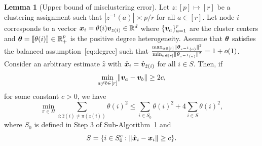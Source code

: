 \documentclass[lettersize,onecolumn,journal]{IEEEtran}
\theoremstyle{definition}
\newtheorem{lem}{Lemma}
\theoremstyle{definition}
\begin{document}
\begin{lem}[Upper bound of misclustering error]\label{lem:upper_mis} Let $z: [p] \mapsto [r]$ be a clustering assignment such that $|z^{-1}(a)| \asymp p/r$ for all $a \in [r]$. Let node $i$ corresponds to a vector $\bm x_i  = \theta(i) \bm{v}_{z(i)} \in \mathbb{R}^d$ where $\{\bm{v}_a\}_{a = 1}^r$ are the cluster centers and $\boldsymbol{\theta} = \llbracket \theta(i) \rrbracket \in \mathbb{R}^p_+$ is the positive degree heterogeneity. Assume that  $\boldsymbol{\theta}$ satisfies the balanced assumption~\eqref{eq:degree} such that ${\max_{a \in [r]} \lVert\boldsymbol{\theta}_{z^{-1}(a)}\rVert^2 \over \min_{a \in [r]} \lVert\boldsymbol{\theta}_{z^{-1}(a)}\rVert^2 }= 1 + o(1)$. Consider an arbitrary estimate $\hat z$ with $\hat {\bm x}_i = \hat {\bm{v}}_{\hat z(i)}$ for all $ i \in S$. Then, if
\begin{equation}
    \min_{a \neq b \in [r]} \lVert\bm{v}_a - \bm{v}_b\rVert \geq 2c,
\end{equation}
 for some constant $c >0$, we have 
\begin{equation}
    \min_{\pi \in \Pi} \sum_{i : \hat z(i) \neq \pi(z(i))} \theta(i)^2 \leq \sum_{i \in S_0} \theta(i)^2 + 4 \sum_{i \in S} \theta(i)^2,
\end{equation}
where $S_0$ is defined in Step 3 of Sub-Algorithm~\hyperref[alg:main]{1} and
\begin{equation}
   S = \{i \in S_0^c: \lVert\hat {\bm x}_i - \bm x_i \rVert \geq c \}.
\end{equation}

\end{lem}
\end{document}
